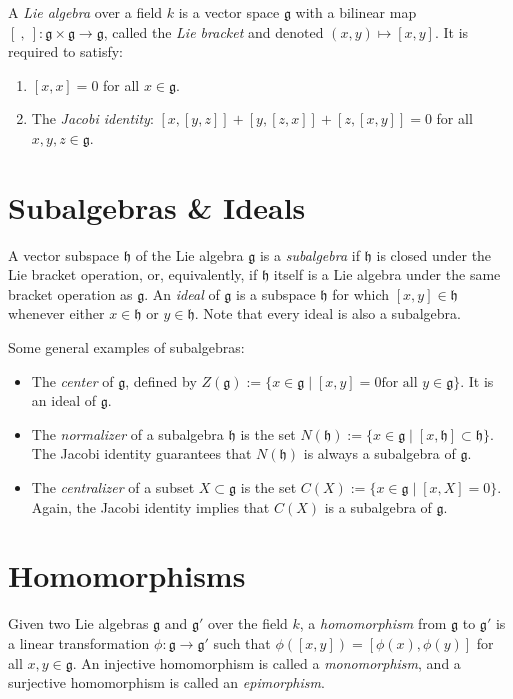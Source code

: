 \documentclass{article}
\newcommand{\g}{\mathfrak{g}}
\newcommand{\h}{\mathfrak{h}}
\begin{document}
A {\em Lie algebra} over a field $k$ is a vector space $\mathfrak{g}$ with a bilinear map $[\ ,\ ] : \mathfrak{g}\times\mathfrak{g}\to\mathfrak{g}$, called the {\em Lie bracket} and denoted $(x,y)\mapsto [x,y]$.  It is required to satisfy:
\begin{enumerate}
\item $[x,x] = 0$ for all $x\in\mathfrak{g}$.
\item The {\em Jacobi identity}: $[x,[y,z]] + [y,[z,x]] + [z,[x,y]] = 0$ for all $x,y,z\in\mathfrak{g}$.
\end{enumerate}

\section{Subalgebras \& Ideals}

A vector subspace $\h$ of the Lie algebra $\g$ is a {\em subalgebra} if $\h$ is closed under the Lie bracket operation, or, equivalently, if $\h$ itself is a Lie algebra under the same bracket operation as $\g$. An {\em ideal} of $\g$ is a subspace $\h$ for which $[x,y] \in \h$ whenever either $x \in \h$ or $y \in \h$. Note that every ideal is also a subalgebra.

Some general examples of subalgebras:
\begin{itemize}
\item The {\em center} of $\g$, defined by $Z(\g) := \{x \in \g \mid [x,y] = 0 \text{for all } y \in \g\}$. It is an ideal of $\g$.
\item The {\em normalizer} of a subalgebra $\h$ is the set $N(\h) := \{x \in \g \mid [x,\h] \subset \h\}$. The Jacobi identity guarantees that $N(\h)$ is always a subalgebra of $\g$.
\item The {\em centralizer} of a subset $X \subset \g$ is the set $C(X) := \{x \in \g \mid [x,X] = 0\}$. Again, the Jacobi identity implies that $C(X)$ is a subalgebra of $\g$.
\end{itemize}

\section{Homomorphisms}
Given two Lie algebras $\g$ and $\g'$ over the field $k$, a {\em homomorphism} from $\g$ to $\g'$ is a linear transformation $\phi: \g \to \g'$ such that $\phi([x,y]) = [\phi(x),\phi(y)]$ for all $x,y \in \g$. An injective homomorphism is called a {\em monomorphism}, and a surjective homomorphism is called an {\em epimorphism}.
\end{document}
